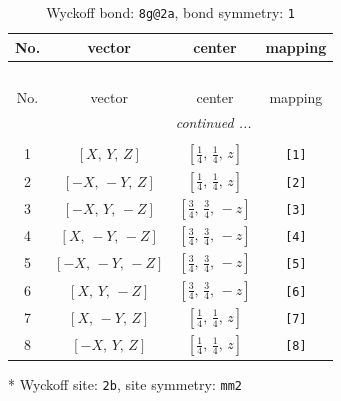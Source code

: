 \documentclass[fleqn,8pt]{jsarticle}
\begin{document}
\renewcommand{\arraystretch}{1.2}
\begin{longtable}{cccc}
\caption{Wyckoff bond: {\tt 8g@2a}, bond symmetry: {\tt 1}}
 \\
 \hline \hline
No. & vector & center & mapping \\ \hline \endfirsthead

\multicolumn{3}{l}{\tablename\ \thetable{}} \\
 \hline \hline
No. & vector & center & mapping \\ \hline \endhead

 \hline \hline
\multicolumn{3}{r}{\footnotesize\it continued ...} \\ \endfoot

 \hline \hline
\multicolumn{3}{r}{} \\ \endlastfoot

1 & $\left[ X,\, Y,\, Z \right]$ & $\left[ \frac{1}{4},\, \frac{1}{4},\, z \right]$ & {\tt [1]} \\ \hline
2 & $\left[ - X,\, - Y,\, Z \right]$ & $\left[ \frac{1}{4},\, \frac{1}{4},\, z \right]$ & {\tt [2]} \\ \hline
3 & $\left[ - X,\, Y,\, - Z \right]$ & $\left[ \frac{3}{4},\, \frac{3}{4},\, - z \right]$ & {\tt [3]} \\ \hline
4 & $\left[ X,\, - Y,\, - Z \right]$ & $\left[ \frac{3}{4},\, \frac{3}{4},\, - z \right]$ & {\tt [4]} \\ \hline
5 & $\left[ - X,\, - Y,\, - Z \right]$ & $\left[ \frac{3}{4},\, \frac{3}{4},\, - z \right]$ & {\tt [5]} \\ \hline
6 & $\left[ X,\, Y,\, - Z \right]$ & $\left[ \frac{3}{4},\, \frac{3}{4},\, - z \right]$ & {\tt [6]} \\ \hline
7 & $\left[ X,\, - Y,\, Z \right]$ & $\left[ \frac{1}{4},\, \frac{1}{4},\, z \right]$ & {\tt [7]} \\ \hline
8 & $\left[ - X,\, Y,\, Z \right]$ & $\left[ \frac{1}{4},\, \frac{1}{4},\, z \right]$ & {\tt [8]} \\
\end{longtable}
* Wyckoff site: {\tt 2b}, site symmetry: {\tt mm2}
\renewcommand{\arraystretch}{1.2}
\end{document}
